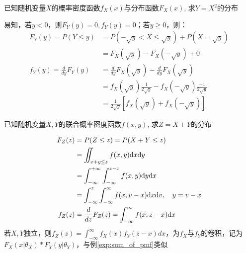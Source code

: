 \begin{example}
    已知随机变量$X$的概率密度函数$f_X(x)$与分布函数$F_X(x)$, 求$Y=X^2$的分布
\end{example}
\begin{solution}
    易知，若$y<0$，则$F_Y(y)=0,f_Y(y)=0$；若$y\ge 0$，则：
    \begin{align*}
        F_Y(y)=P(Y\le y)           & =P(-\sqrt{y}<X\le \sqrt{y})+P(X=\sqrt{y})                             \\
                                   & =F_X(\sqrt{y})-F_X(-\sqrt{y})+0                                       \\
        f_Y(y) =\frac{d}{dy}F_Y(y) & =\frac{d}{dy}F_X(\sqrt{y}) -\frac{d}{dy}F_X(\sqrt{y})                 \\
                                   & =f_X(\sqrt{y})\frac{1}{2\sqrt{y}} -f_X(-\sqrt{y})\frac{-1}{2\sqrt{y}} \\
                                   & =\frac1{2\sqrt{y}}[f_X(\sqrt{y})+f_X(-\sqrt{y})]
    \end{align*}
\end{solution}

\begin{example}[连续变量之和]\label{exp:sum_of_pdf}
    已知随机变量$X,Y$的联合概率密度函数$f(x,y)$, 求$Z=X+Y$的分布
\end{example}
\begin{solution}
    \begin{align*}
        F_Z(z) & =P(Z\le z)=P(X+Y\le z)                                                    \\
               & =\iint_{x+y\le z}f(x,y)\mathrm{d} x \mathrm{d} y                                          \\
               & =\int_{-\infty}^{+\infty}\int_{-\infty}^{z-x}f(x,y) \mathrm{d} y \mathrm{d} x             \\
               & =\int_{-\infty}^{z}\int_{-\infty}^{\infty}f(x,v-x)\mathrm{d} x \mathrm{d} v, \quad y= v-x \\
        f_Z(z) & =\frac{d}{dz}F_Z(z)=\int_{-\infty}^{\infty}f(x,z-x)\mathrm{d} x
    \end{align*}
    若$X,Y$独立，则$f_Z(z)=\int_{-\infty}^{\infty}f_X(x)f_Y(z-x)dx$，为$f_X$与$f_Y$的卷积，记为$F_X(x|\theta_X)*F_Y(y|\theta_Y)$，与例\ref{exp:sum_of_pmf}类似
\end{solution}

